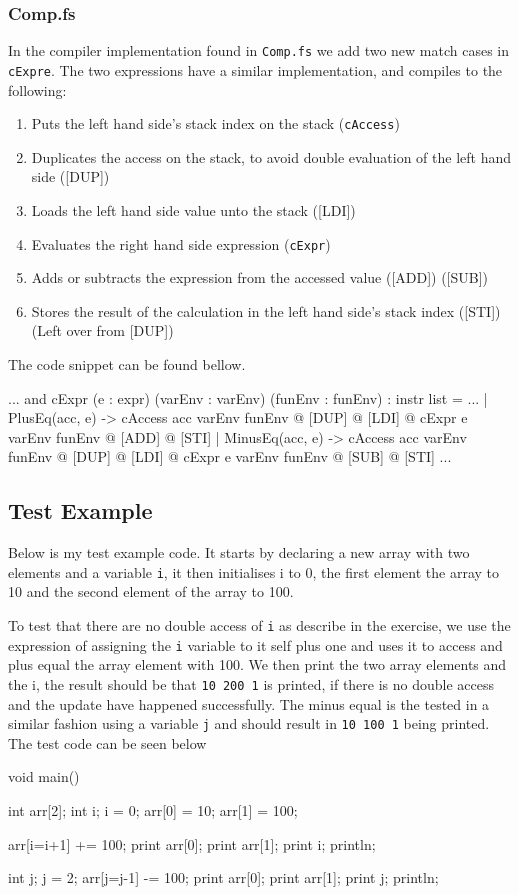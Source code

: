 \subsubsection*{Comp.fs}
In the compiler implementation found in \texttt{Comp.fs} we add two new match
cases in \texttt{cExpre}. The two expressions have a similar implementation, and
compiles to the following:
\begin{enumerate}
    \item Puts the left hand side's stack index on the stack (\texttt{cAccess})
    \item Duplicates the access on the stack, to avoid double evaluation of the
        left hand side ([DUP])
    \item Loads the left hand side value unto the stack ([LDI])
    \item Evaluates the right hand side expression (\texttt{cExpr})
    \item Adds or subtracts the expression from the accessed value ([ADD])
        ([SUB]) 
    \item Stores the result of the calculation in the left hand side's stack
        index ([STI]) (Left over from [DUP])
\end{enumerate}
The code snippet can be found bellow.
\begin{fs}
...
and cExpr (e : expr) (varEnv : varEnv) (funEnv : funEnv) : instr list = 
...
    | PlusEq(acc, e)  -> cAccess acc varEnv funEnv @ [DUP] @ [LDI] @ cExpr e varEnv funEnv @ [ADD] @ [STI]
    | MinusEq(acc, e)  -> cAccess acc varEnv funEnv @ [DUP] @ [LDI] @ cExpr e varEnv funEnv @ [SUB] @ [STI]
...
\end{fs}

\subsection{Test Example}
Below is my test example code. It starts by declaring a new array with two
elements and a variable \texttt{i}, it then initialises i to 0, the first element the
array to 10 and the second element of the array to 100.

To test that there are no double access of \texttt{i} as describe in the
exercise, we use the expression of assigning the \texttt{i} variable to it self
plus one and uses it to access and plus equal the array element with 100. We
then print the two array elements and the i, the result should be that
\texttt{10 200 1} is printed, if there is no double access and the update have
happened successfully. The minus equal is the tested in a similar fashion using
a variable \texttt{j} and should result in \texttt{10 100 1} being printed. The
test code can be seen below
\begin{ccode}
void main() {
    int arr[2];
    int i;
    i = 0;
    arr[0] = 10;
    arr[1] = 100;
    
    arr[i=i+1] += 100;
    print arr[0];
    print arr[1];
    print i;
    println;

    int j;
    j = 2;
    arr[j=j-1] -= 100;
    print arr[0];
    print arr[1];
    print j;
    println;
}
\end{ccode}
